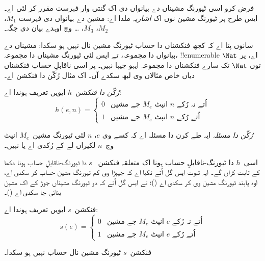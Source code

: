 \documentclass[../../../include/open-logic-section]{subfiles}
\begin{document}

\begin{explain}
فرض کرو اسی ٹیورنگ مشیناں دے بیانواں دی اک گنتی وار
فہرست مقرر کر لئی اے۔ ایس طرح ہر ٹیورنگ مشین نوں اک
\emph{اشاریہ} ملدا اے: مشین دے بیانواں دی فہرست
$M_1$، $M_2$، $M_3$، \dots{} وچ اوہدے بیان دی جگہ۔

سانوں پتا اے کہ کجھ فنکشناں دا حساب ٹیورنگ مشین نال
نہیں ہو سکدا: مشیناں دے بیانواں دا مجموعہ، تے ایس لئی
ٹیورنگ مشیناں دا مجموعہ، !!{enumerable} اے، پر
$\Nat$ توں $\Nat$ تک سارے فنکشناں دا مجموعہ
ایہو جیہا نہیں۔ پر اسی ناقابلِ حساب فنکشناں دیاں خاص
مثالاں وی لبھ سکدے آں۔ اک مثال رُکّن دا فنکشن اے۔
\end{explain}

\begin{defn}[رُکّن دا فنکشن]
 \emph{رُکّن دا فنکشن}~$h$ ایویں تعریف ہوندا اے:
\[
h(e,n) =
\begin{cases}
  \text{0} & \text{جے مشین~$M_e$ انپٹ $n$ اُتے نہ رُکے} \\
  \text{1} & \text{جے مشین~$M_e$ انپٹ $n$ اُتے رُکے}
\end{cases}
\]
\end{defn}

\begin{defn}[رُکّن دا مسئلہ]
\emph{رُکّن دا مسئلہ} ایہ طے کرن دا مسئلہ اے کہ کسے وی
$e$، $n$ لئی ٹیورنگ مشین~$M_e$ انپٹ وچ~$n$ لکیراں
لے کے رُکدی اے یا نہیں۔
\end{defn}

\begin{explain}
اسی~$h$ دا ٹیورنگ-ناقابلِ حساب ہونا اک متعلقہ فنکشن
~$s$ دا ٹیورنگ-ناقابلِ حساب ہونا دکھا کے ثابت کراں گے۔
ایہ ثبوت ایس گل اُتے ٹکیا اے کہ جیہڑا وی کم ٹیورنگ
مشین حساب کر سکدی اے، اوہ پابند ٹیورنگ مشین وی کر
سکدی اے ()؛ تے ایس گل اُتے
کہ دو ٹیورنگ مشیناں جوڑ کے اک مشین بنائی جا سکدی اے
()۔
\end{explain}

\begin{defn} فنکشن~$s$ ایویں تعریف ہوندا اے:
\[
s(e) =
\begin{cases}
  \text{0} & \text{جے مشین~$M_e$ انپٹ $e$ اُتے نہ رُکے} \\
  \text{1} & \text{جے مشین~$M_e$ انپٹ $e$ اُتے رُکے}
\end{cases}
\]
\end{defn}

\begin{lem}
فنکشن~$s$ ٹیورنگ مشین نال حساب نہیں ہو سکدا۔
\end{lem}
\end{document}
